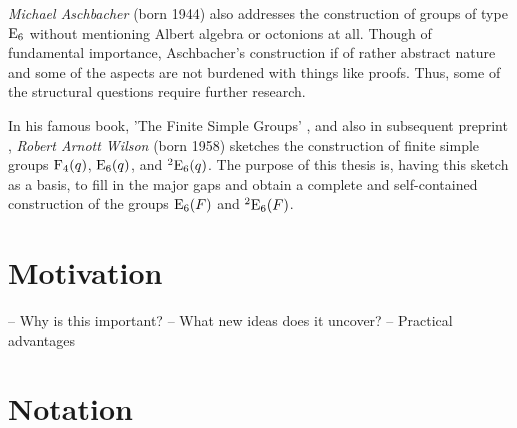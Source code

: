 \textit{Michael Aschbacher} (born 1944) also addresses the 
construction of groups of type $\mathrm{E}_6$ without mentioning Albert
algebra or octonions at all. Though of fundamental importance,
Aschbacher's construction if of rather abstract nature and some
of the aspects are not burdened with things like proofs. Thus,
some of the structural questions require further research. 

In his famous book, 'The Finite Simple Groups' \cite{WilsonBook},
and also in subsequent preprint \cite{WilsonPaper},
\textit{Robert Arnott Wilson} (born 1958) sketches the
construction of finite simple groups $\mathrm{F}_4(q)$, 
$\mathrm{E}_6(q)$, and ${}^2\mathrm{E}_6(q)$. The purpose of this thesis is,
having this sketch as a basis, to fill in the major gaps and 
obtain a complete and self-contained construction of the groups 
$\mathrm{E}_6(F)$ and ${}^2\mathrm{E}_6(F)$.

\section{{Motivation}}

-- Why is this important? 
-- What new ideas does it uncover?
-- Practical advantages

\section{{Notation}}




